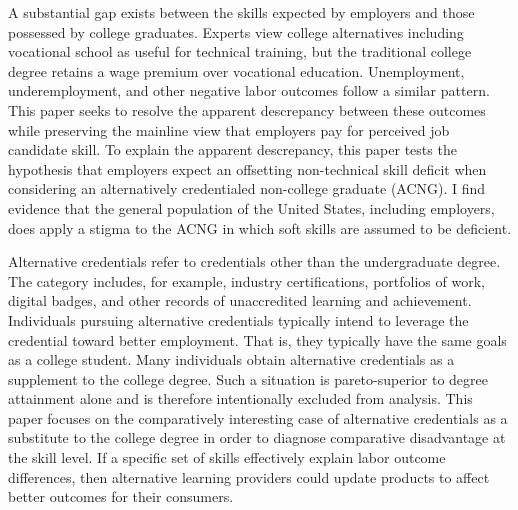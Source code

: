 \documentclass[review]{elsarticle}
\begin{document}

A substantial gap exists between the skills expected by employers and those possessed by college graduates\cite{mcgarry2016examination, malik2017great, abbasi2018analysis, gingras2000there}.
Experts view college alternatives including vocational school as useful for technical training, but the traditional college degree retains a wage premium over vocational education.
Unemployment, underemployment, and other negative labor outcomes follow a similar pattern\cite{smith_2011}.
This paper seeks to resolve the apparent descrepancy between these outcomes while preserving the mainline view that employers pay for perceived job candidate skill.
To explain the apparent descrepancy,
this paper tests the hypothesis that employers expect an offsetting non-technical skill deficit when considering an alternatively credentialed non-college graduate (ACNG).
I find evidence that the general population of the United States, including employers, does apply a stigma to the ACNG in which soft skills are assumed to be deficient.

Alternative credentials refer to credentials other than the undergraduate degree\cite{brown2017complex}.
The category includes, for example,
industry certifications,
portfolios of work,
digital badges, and other records of unaccredited learning and achievement.
Individuals pursuing alternative credentials typically intend to leverage the credential toward better employment.
That is, they typically have the same goals as a college student.
Many individuals obtain alternative credentials as a supplement to the college degree.
Such a situation is pareto-superior to degree attainment alone and is therefore intentionally excluded from analysis.
This paper focuses on the comparatively interesting case of alternative credentials as a substitute to the college degree in order to diagnose comparative disadvantage at the skill level.
If a specific set of skills effectively explain labor outcome differences,
then alternative learning providers could update products to affect better outcomes for their consumers.

\end{document}

